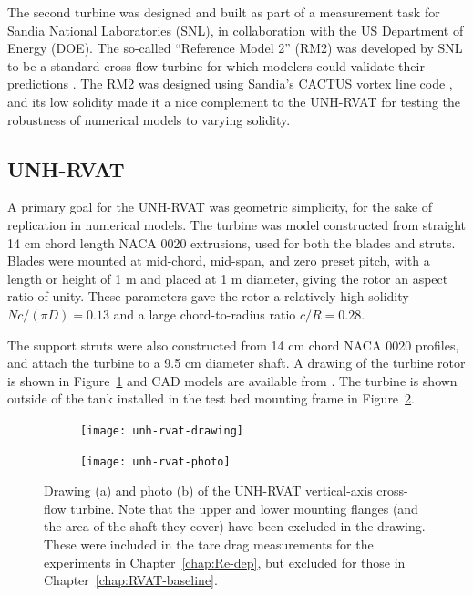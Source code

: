 The second turbine was designed and built as part of a measurement task for
Sandia National Laboratories (SNL), in collaboration with the US Department of
Energy (DOE). The so-called ``Reference Model 2'' (RM2) was developed by SNL to
be a standard cross-flow turbine for which modelers could validate their
predictions \cite{Neary2014}. The RM2 was designed using Sandia's CACTUS vortex
line code \cite{Barone2011}, and its low solidity made it a nice complement to
the UNH-RVAT for testing the robustness of numerical models to varying solidity.


\subsection{UNH-RVAT}

A primary goal for the UNH-RVAT was geometric simplicity, for the sake of
replication in numerical models. The turbine was model constructed from straight
14 cm chord length NACA 0020 extrusions, used for both the blades and struts.
Blades were mounted at mid-chord, mid-span, and zero preset pitch, with a length
or height of 1 m and placed at 1 m diameter, giving the rotor an aspect ratio of
unity. These parameters gave the rotor a relatively high solidity $Nc/(\pi D) =
0.13$ and a large chord-to-radius ratio $c/R = 0.28$. 

The support struts were also constructed from 14 cm chord NACA 0020 profiles,
and attach the turbine to a 9.5 cm diameter shaft. A drawing of the turbine
rotor is shown in Figure~\ref{fig:rvat-drawing} and CAD models are available
from \cite{Bachant2014-RVAT-CAD}. The turbine is shown outside of the tank
installed in the test bed mounting frame in Figure~\ref{fig:rvat-photo}.

\begin{figure}[ht]
    \centering
    \begin{subfigure}{0.47\textwidth}
        \texttt{[image: unh-rvat-drawing]}
        \caption{}
        \label{fig:rvat-drawing}
    \end{subfigure}
    \begin{subfigure}{0.47\textwidth}
        \texttt{[image: unh-rvat-photo]}
        \caption{}
        \label{fig:rvat-photo}
    \end{subfigure}
    
    \caption{Drawing (a) and photo (b) of the UNH-RVAT vertical-axis cross-flow
        turbine. Note that the upper and lower mounting flanges (and the area of the
        shaft they cover) have been excluded in the drawing. These were included in
        the tare drag measurements for the experiments in Chapter~\ref{chap:Re-dep},
        but excluded for those in Chapter~\ref{chap:RVAT-baseline}.}
    
    \label{fig:unh-rvat}
\end{figure}


